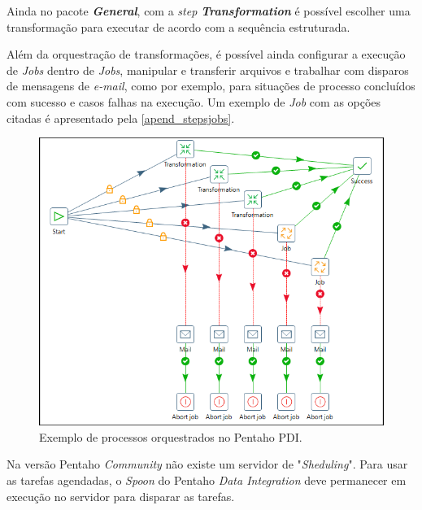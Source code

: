 \begin{apendicesenv}
Ainda no pacote \textit{\textbf{General}}, com a \textit{step \textbf{Transformation}} é possível escolher uma transformação para executar de acordo com a sequência estruturada.

\newpage
Além da orquestração de transformações, é possível ainda configurar a execução de \textit{Jobs} dentro de \textit{Jobs}, manipular e transferir arquivos e trabalhar com disparos de mensagens de \textit{e-mail}, como por exemplo, para situações de processo concluídos com sucesso e casos falhas na execução. Um exemplo de \textit{Job} com as opções citadas é apresentado pela \autoref{apend_stepsjobs}.

\begin{figure}[htb]
	\caption{\label{apend_stepsjobs}Exemplo de processos orquestrados no Pentaho PDI.}
	\begin{center}
	    \includegraphics[scale=0.7]{Imagens/apendice jobs no pdi.png}
	\end{center}
\end{figure}

Na versão Pentaho \textit{Community} não existe um servidor de "\textit{Sheduling}". Para usar as tarefas agendadas, o \textit{Spoon} do Pentaho \textit{Data Integration} deve permanecer em execução no servidor para disparar as tarefas.

\end{apendicesenv}